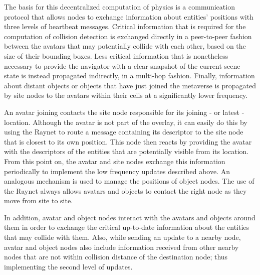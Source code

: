 

The basis for this decentralized computation of physics is a
communication protocol that allows nodes to exchange information about
entities' positions with three levels of heartbeat messages. Critical
information that is required for the computation of collision
detection is exchanged directly in a peer-to-peer fashion between the
avatars that may potentially collide with each other, based on the
size of their bounding boxes. Less critical information that is
nonetheless necessary to provide the navigator with a clear snapshot
of the current scene state is instead propagated indirectly, in a
multi-hop fashion. Finally, information about distant objects or
objects that have just joined the metaverse is propagated by site
nodes to the avatars within their cells at a significantly lower
frequency.

An avatar joining \sol contacts the site node responsible for its
joining - or latest - location. Although the avatar is not part of the
overlay, it can easily do this by using the Raynet to route a message
containing its descriptor to the site node that is closest to its own
position. This node then reacts by providing the avatar with the
descriptors of the entities that are potentially visible from its
location. From this point on, the avatar and site nodes exchange this
information periodically to implement the low frequency updates
described above.  An analogous mechanism is used to manage the
positions of object nodes. The use of the Raynet always allows avatars
and objects to contact the right node as they move from site to site.

In addition, avatar and object nodes interact with the avatars and
objects around them in order to exchange the critical up-to-date
information about the entities that may collide with them.  Also,
while sending an update to a nearby node, avatar and object nodes also
include information received from other nearby nodes that are not
within collision distance of the destination node; thus implementing
the second level of \ptp updates. %



